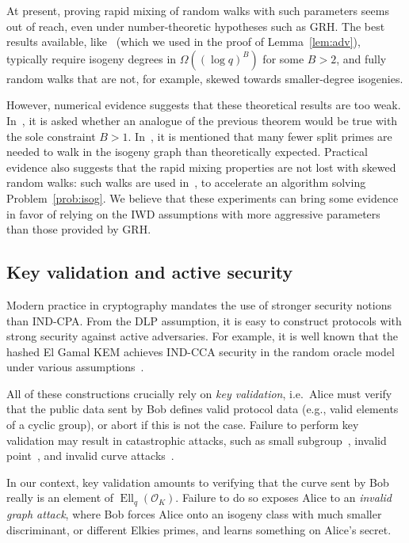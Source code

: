 \documentclass{llncs}
\renewcommand{\O}{\mathcal{O}}
\DeclareMathOperator{\Ell}{Ell}
\begin{document}
At present, proving rapid mixing of random walks with such
parameters seems out of reach, even under number-theoretic
hypotheses such as GRH. The best results available,
like~\cite[Theorem~1.5]{jao+miller+venkatesan09}
(which we used in the proof of Lemma~\ref{lem:adv}),
typically require isogeny degrees in $\Omega((\log q)^B)$
for some $B>2$, and fully random walks that are not,
for example, skewed towards smaller-degree isogenies.

However, numerical evidence suggests that
these theoretical results are too weak. In~\cite[7.2]{jao+miller+venkatesan09},
it is asked whether an analogue of the previous theorem would
be true with the sole constraint $B>1$. In~\cite[Section~3]{GHS},
it is mentioned that many fewer split primes are needed to walk
in the isogeny graph than theoretically expected.
Practical evidence also suggests that the rapid mixing
properties are not lost with skewed random walks:
such walks are used in~\cite{galbraith+stolbunov11},
to accelerate an algorithm solving Problem~\ref{prob:isog}.
We believe that these experiments can bring some evidence
in favor of relying on the IWD assumptions with more aggressive
parameters than those provided by GRH.


\subsection{Key validation and active security}
\label{sec:validation}

Modern practice in cryptography mandates the use of stronger security
notions than IND-CPA.  From the DLP assumption, it is easy to
construct protocols with strong security against active adversaries.
For example, it is well known that the hashed El Gamal KEM achieves
IND-CCA security in the random oracle model under various
assumptions~\cite[§7]{10.1007/3-540-45353-9_12,cryptoeprint:1999:007,doi:10.1137/S0097539702403773}.

All of these constructions crucially rely on \emph{key validation}, 
i.e.\ Alice must verify that the public data sent by Bob defines valid
protocol data (e.g., valid elements of a cyclic group), or abort if
this is not the case.
Failure to perform key validation may result in catastrophic attacks,
such as small subgroup~\cite{10.1007/BFb0052240}, invalid
point~\cite{10.1007/3-540-44598-6_8}, and invalid curve
attacks~\cite{Ciet2005}.  

In our context, key validation amounts to
verifying that the curve sent by Bob really is an element of
$\Ell_q(\O_K)$. Failure to do so exposes Alice to an \emph{invalid
  graph attack}, where Bob forces Alice onto an isogeny class with much
smaller discriminant, or different Elkies primes, and learns something
on Alice's secret.
\end{document}
